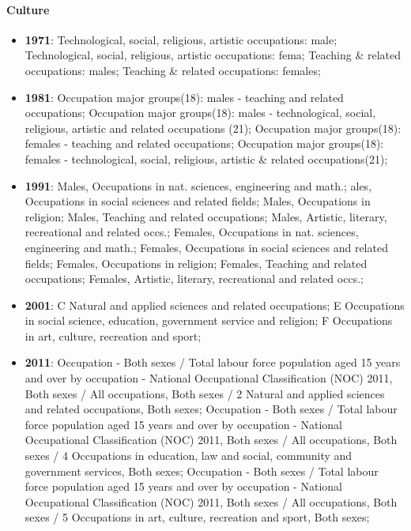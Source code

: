 \documentclass[a4paper]{article}
\begin{document}
\paragraph{Culture}
\begin{itemize}
   \item{\textbf{1971}:  Technological, social, religious, artistic occupations: male; Technological, social, religious, artistic occupations: fema; Teaching \& related occupations: males; Teaching \& related occupations: females;}
   \item{\textbf{1981}:  Occupation major groups(18): males - teaching and related occupations; Occupation major groups(18): males - technological, social, religious, artistic and related occupations (21); Occupation major groups(18): females - teaching and related occupations; Occupation major groups(18): females - technological, social, religious, artistic \& related occupations(21);}
   \item{\textbf{1991}:  Males, Occupations in nat. sciences, engineering and math.; ales, Occupations in social sciences and related fields; Males, Occupations in religion; Males, Teaching and related occupations; Males, Artistic, literary, recreational and related occs.; Females, Occupations in nat. sciences, engineering and math.; Females, Occupations in social sciences and related fields; Females, Occupations in religion; Females, Teaching and related occupations; Females, Artistic, literary, recreational and related occs.;}
   \item{\textbf{2001}:  C Natural and applied sciences and related occupations; E Occupations in social science, education, government service and religion; F Occupations in art, culture, recreation and sport;}
   \item{\textbf{2011}:  Occupation - Both sexes / Total labour force population aged 15 years and over by occupation - National Occupational Classification (NOC) 2011, Both sexes / All occupations, Both sexes / 2 Natural and applied sciences and related occupations, Both sexes; Occupation - Both sexes / Total labour force population aged 15 years and over by occupation - National Occupational Classification (NOC) 2011, Both sexes / All occupations, Both sexes / 4 Occupations in education, law and social, community and government services, Both sexes; Occupation - Both sexes / Total labour force population aged 15 years and over by occupation - National Occupational Classification (NOC) 2011, Both sexes / All occupations, Both sexes / 5 Occupations in art, culture, recreation and sport, Both sexes;}
\end{itemize}
\end{document}
